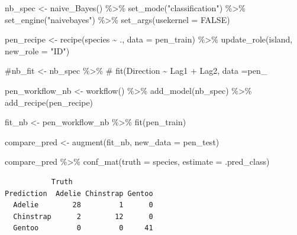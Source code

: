 \documentclass[
  letterpaper,
  DIV=11,
  numbers=noendperiod]{scrreprt}
\newenvironment{Shaded}{\begin{snugshade}}{\end{snugshade}}
\newcommand{\AttributeTok}[1]{\textcolor[rgb]{0.40,0.45,0.13}{#1}}
\newcommand{\CommentTok}[1]{\textcolor[rgb]{0.37,0.37,0.37}{#1}}
\newcommand{\ConstantTok}[1]{\textcolor[rgb]{0.56,0.35,0.01}{#1}}
\newcommand{\FunctionTok}[1]{\textcolor[rgb]{0.28,0.35,0.67}{#1}}
\newcommand{\NormalTok}[1]{\textcolor[rgb]{0.00,0.23,0.31}{#1}}
\newcommand{\OtherTok}[1]{\textcolor[rgb]{0.00,0.23,0.31}{#1}}
\newcommand{\SpecialCharTok}[1]{\textcolor[rgb]{0.37,0.37,0.37}{#1}}
\newcommand{\StringTok}[1]{\textcolor[rgb]{0.13,0.47,0.30}{#1}}
\begin{document}
\begin{Shaded}
\begin{Highlighting}[]
\NormalTok{nb\_spec }\OtherTok{\textless{}{-}} \FunctionTok{naive\_Bayes}\NormalTok{() }\SpecialCharTok{\%\textgreater{}\%} 
  \FunctionTok{set\_mode}\NormalTok{(}\StringTok{"classification"}\NormalTok{) }\SpecialCharTok{\%\textgreater{}\%} 
  \FunctionTok{set\_engine}\NormalTok{(}\StringTok{"naivebayes"}\NormalTok{) }\SpecialCharTok{\%\textgreater{}\%} 
  \FunctionTok{set\_args}\NormalTok{(}\AttributeTok{usekernel =} \ConstantTok{FALSE}\NormalTok{)  }


\NormalTok{pen\_recipe }\OtherTok{\textless{}{-}} 
  \FunctionTok{recipe}\NormalTok{(species }\SpecialCharTok{\textasciitilde{}}\NormalTok{ ., }\AttributeTok{data =}\NormalTok{ pen\_train) }\SpecialCharTok{\%\textgreater{}\%} 
  \FunctionTok{update\_role}\NormalTok{(island,  }\AttributeTok{new\_role =} \StringTok{"ID"}\NormalTok{)}


\CommentTok{\#nb\_fit \textless{}{-} nb\_spec \%\textgreater{}\% }
\CommentTok{\#  fit(Direction \textasciitilde{} Lag1 + Lag2, data =pen\_}

\NormalTok{pen\_workflow\_nb }\OtherTok{\textless{}{-}} \FunctionTok{workflow}\NormalTok{() }\SpecialCharTok{\%\textgreater{}\%}
  \FunctionTok{add\_model}\NormalTok{(nb\_spec) }\SpecialCharTok{\%\textgreater{}\%}
  \FunctionTok{add\_recipe}\NormalTok{(pen\_recipe)}

\NormalTok{fit\_nb }\OtherTok{\textless{}{-}}\NormalTok{ pen\_workflow\_nb }\SpecialCharTok{\%\textgreater{}\%} \FunctionTok{fit}\NormalTok{(pen\_train)}
\end{Highlighting}
\end{Shaded}

\begin{Shaded}
\begin{Highlighting}[]
\NormalTok{compare\_pred }\OtherTok{\textless{}{-}} \FunctionTok{augment}\NormalTok{(fit\_nb, }\AttributeTok{new\_data =}\NormalTok{ pen\_test) }

\NormalTok{compare\_pred }\SpecialCharTok{\%\textgreater{}\%} \FunctionTok{conf\_mat}\NormalTok{(}\AttributeTok{truth =}\NormalTok{ species, }\AttributeTok{estimate =}\NormalTok{ .pred\_class)}
\end{Highlighting}
\end{Shaded}

\begin{verbatim}
           Truth
Prediction  Adelie Chinstrap Gentoo
  Adelie        28         1      0
  Chinstrap      2        12      0
  Gentoo         0         0     41
\end{verbatim}
\end{document}
